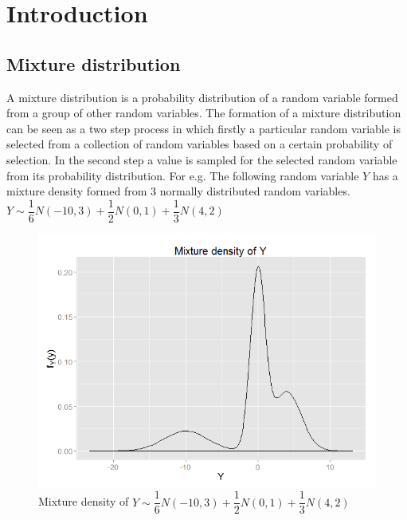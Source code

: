 
\chapter{Introduction}
\label{ch : introduction}

\section{Mixture distribution}
\label{sec : mixture_distribution}
A mixture distribution is a probability distribution of a random variable formed from a group of other random variables. The formation of a mixture distribution can be seen as a two step process in which firstly a particular random variable is selected from a collection of random variables based on a certain probability of selection. In the second step a value is sampled for the selected random variable from its probability distribution. For e.g. The following random variable $Y$ has a mixture density formed from 3 normally distributed random variables.\\

$Y \sim \dfrac{1}{6}N(-10,3) + \dfrac{1}{2}N(0,1) + \dfrac{1}{3}N(4,2)$\\

\begin{figure}
	\centering
	\includegraphics[scale=0.5]{mainmatter/chapter_1_introduction/mixture_density.png}
	\caption{Mixture density of $Y \sim \dfrac{1}{6}N(-10,3) + \dfrac{1}{2}N(0,1) + \dfrac{1}{3}N(4,2)$}
	\label{fig : mixture_density_1}
\end{figure}

